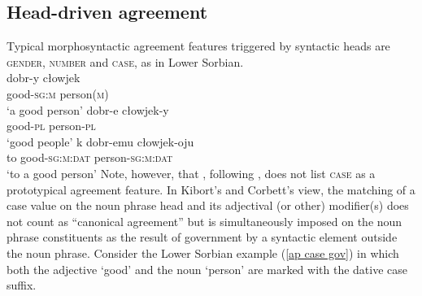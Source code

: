 \subsection{Head\hyp{}driven agreement} \label{head-driven agreement}
Typical morphosyntactic agreement features triggered by syntactic heads are \textsc{gender, number} and \textsc{case}, as in Lower Sorbian.
\ea \label{sorbian agr}
\\
\ea
\gll	dobr-y cłowjek\\
	good-\textsc{sg:m} person(\textsc{m})\\
\glt	‘a good person’
\ex
\gll	dobr-e cłowjek-y\\
	good-\textsc{pl} person-\textsc{pl}\\
\glt	‘good people’
\ex \label{ap case gov}
\gll	k dobr-emu cłowjek-oju\\
	to good-\textsc{sg:m:dat} person-\textsc{sg:m:dat}\\
\glt	‘to a good person’
\z
\z 
Note, however, that \citet{kibort2010a}, following \citet[133–135]{corbett2006}, does not list \textsc{case} as a prototypical agreement feature. In Kibort's and Corbett's view, the matching of a case value on the noun phrase head and its adjectival (or other) modifier(s) does not count as “canonical agreement” but is simultaneously imposed on the noun phrase constituents as the result of government by a syntactic element outside the noun phrase. Consider the Lower Sorbian example (\ref{ap case gov}) in which both the adjective ‘good’ and the noun ‘person’ are marked with the dative case suffix.


